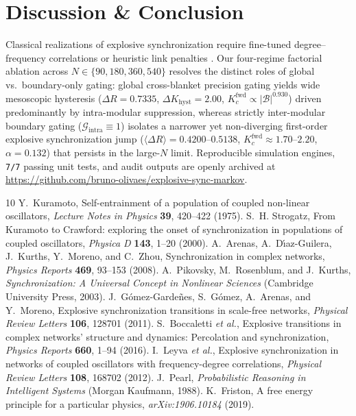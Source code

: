 \documentclass[11pt,a4paper]{article}
\begin{document}
\section{Discussion \& Conclusion}
Classical realizations of explosive synchronization require fine-tuned degree--frequency correlations or heuristic link penalties \cite{GomezGardenes2011, Boccaletti2016}. Our four-regime factorial ablation across $N \in \{90, 180, 360, 540\}$ resolves the distinct roles of global vs.\ boundary-only gating: global cross-blanket precision gating yields wide mesoscopic hysteresis ($\Delta R = 0.7335$, $\Delta K_{\mathrm{hyst}} = 2.00$, $K_c^{\mathrm{fwd}} \propto |\mathcal{B}|^{0.930}$) driven predominantly by intra-modular suppression, whereas strictly inter-modular boundary gating ($\mathcal{G}_{\mathrm{intra}} \equiv 1$) isolates a narrower yet non-diverging first-order explosive synchronization jump ($\langle\Delta R\rangle = 0.4200\text{--}0.5138$, $K_c^{\mathrm{fwd}} \approx 1.70\text{--}2.20$, $\alpha = 0.132$) that persists in the large-$N$ limit. Reproducible simulation engines, \texttt{7/7} passing unit tests, and audit outputs are openly archived at \url{https://github.com/bruno-olivaes/explosive-sync-markov}.

\begin{thebibliography}{10}
 Y.~Kuramoto, Self-entrainment of a population of coupled non-linear oscillators, \emph{Lecture Notes in Physics} \textbf{39}, 420--422 (1975).
 S.~H. Strogatz, From Kuramoto to Crawford: exploring the onset of synchronization in populations of coupled oscillators, \emph{Physica D} \textbf{143}, 1--20 (2000).
 A.~Arenas, A.~D{\'\i}az-Guilera, J.~Kurths, Y.~Moreno, and C.~Zhou, Synchronization in complex networks, \emph{Physics Reports} \textbf{469}, 93--153 (2008).
 A.~Pikovsky, M.~Rosenblum, and J.~Kurths, \emph{Synchronization: A Universal Concept in Nonlinear Sciences} (Cambridge University Press, 2003).
 J.~G{\'o}mez-Garde{\~n}es, S.~G{\'o}mez, A.~Arenas, and Y.~Moreno, Explosive synchronization transitions in scale-free networks, \emph{Physical Review Letters} \textbf{106}, 128701 (2011).
 S.~Boccaletti \emph{et al.}, Explosive transitions in complex networks' structure and dynamics: Percolation and synchronization, \emph{Physics Reports} \textbf{660}, 1--94 (2016).
 I.~Leyva \emph{et al.}, Explosive synchronization in networks of coupled oscillators with frequency-degree correlations, \emph{Physical Review Letters} \textbf{108}, 168702 (2012).
 J.~Pearl, \emph{Probabilistic Reasoning in Intelligent Systems} (Morgan Kaufmann, 1988).
 K.~Friston, A free energy principle for a particular physics, \emph{arXiv:1906.10184} (2019).
\end{thebibliography}
\end{document}

